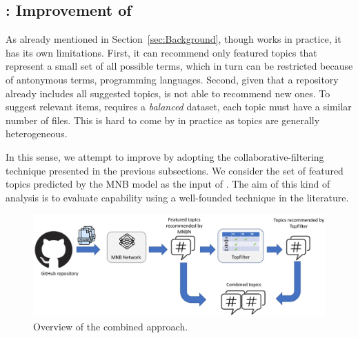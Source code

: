 \subsection{\TFb: Improvement of \MNB} \label{sec:combined_approach}


As already mentioned in Section~\ref{sec:Background}, though \MNB works in practice, it has its own limitations. First, it can recommend only featured topics that represent a small set of all possible terms, which in turn can be restricted because of antonymous terms, \eg programming languages. Second, given that a repository already includes all suggested topics, \MNB is not able to recommend new ones. %
To suggest relevant items, \MNB requires a \emph{balanced} dataset, \ie each topic must have a similar number of \RM files. This is hard to come by in practice as topics are generally heterogeneous.



In this sense, we attempt to improve \MNB by adopting the collaborative-filtering technique presented in the previous subsections. We consider the set of featured topics predicted by the MNB model as the input of \TF. The aim of this kind of analysis is to evaluate \TF capability using a well-founded technique in the literature.


\begin{figure}
	\centering
	\includegraphics[width=\linewidth]{figs/entangled}
	\caption{Overview of the combined approach.}
	\label{fig:entangled}
\end{figure}

